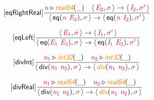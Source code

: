 \documentclass[10pt,leqno,fleqn]{article}
\newcommand{\artVariable}[1]{\mbox{\color{purple}\em #1\/}}
\newcommand{\artConstructor}[1]{\mbox{\sf #1}}
\newcommand{\artSpecial}[1]{\mbox{\color{orange}\sf\em #1}}
\begin{document}
\begin{equation}
\tag*{[\artConstructor{\sf eqRightReal}]}
\begin{split}\frac{ \artVariable{n}\triangleright \artSpecial{real64}(\_) \quad \langle\, \artVariable{E$_{2}$}, \artVariable{$\sigma$}\,\rangle \rightarrow \langle\, \artVariable{I$_{2}$}, \artVariable{$\sigma$\/$^\prime$}\,\rangle }{\langle\, \artConstructor{\sf eq}(\artVariable{n}\ \artVariable{E$_{2}$}), \artVariable{$\sigma$}\,\rangle \rightarrow \langle\, \artConstructor{\sf eq}(\artVariable{n}\ \artVariable{I$_{2}$}), \artVariable{$\sigma$\/$^\prime$}\,\rangle }
\end{split}
\end{equation}

\begin{equation}
\tag*{[\artConstructor{\sf eqLeft}]}
\begin{split}\frac{\langle\, \artVariable{E$_{1}$}, \artVariable{$\sigma$}\,\rangle \rightarrow \langle\, \artVariable{I$_{1}$}, \artVariable{$\sigma$\/$^\prime$}\,\rangle }{\langle\, \artConstructor{\sf eq}(\artVariable{E$_{1}$}\ \artVariable{E$_{2}$}), \artVariable{$\sigma$}\,\rangle \rightarrow \langle\, \artConstructor{\sf eq}(\artVariable{I$_{1}$}\ \artVariable{E$_{2}$}), \artVariable{$\sigma$\/$^\prime$}\,\rangle }
\end{split}
\end{equation}

\begin{equation}
\tag*{[\artConstructor{\sf divInt}]}
\begin{split}\frac{ \artVariable{n$_{1}$}\triangleright \artSpecial{int32}(\_) \quad  \artVariable{n$_{2}$}\triangleright \artSpecial{int32}(\_) }{\langle\, \artConstructor{\sf div}(\artVariable{n$_{1}$}\ \artVariable{n$_{2}$}), \artVariable{$\sigma$}\,\rangle \rightarrow \langle\, \artSpecial{div}(\artVariable{n$_{1}$}\ \artVariable{n$_{2}$}), \artVariable{$\sigma$}\,\rangle }
\end{split}
\end{equation}

\begin{equation}
\tag*{[\artConstructor{\sf divReal}]}
\begin{split}\frac{ \artVariable{n$_{1}$}\triangleright \artSpecial{real64}(\_) \quad  \artVariable{n$_{2}$}\triangleright \artSpecial{real64}(\_) }{\langle\, \artConstructor{\sf div}(\artVariable{n$_{1}$}\ \artVariable{n$_{2}$}), \artVariable{$\sigma$}\,\rangle \rightarrow \langle\, \artSpecial{div}(\artVariable{n$_{1}$}\ \artVariable{n$_{2}$}), \artVariable{$\sigma$}\,\rangle }
\end{split}
\end{equation}
\end{document}
